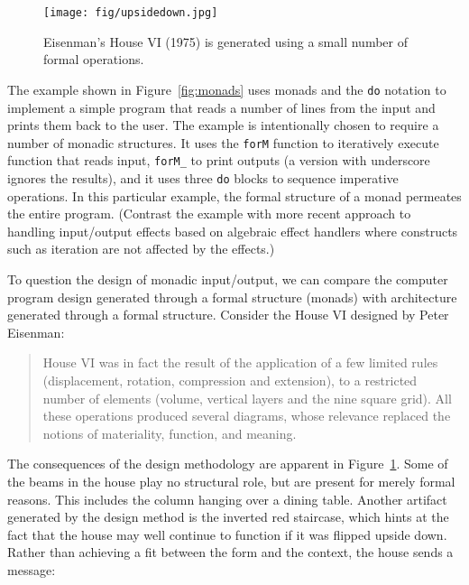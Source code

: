 \begin{figure}
\centering
\vspace{-1em}
\texttt{[image: fig/upsidedown.jpg]}
\caption{Eisenman's House VI (1975) is generated using a small number of formal operations.}
\label{fig:upsidedown}
\end{figure}

The example shown in Figure~\ref{fig:monads} uses monads and the \texttt{do} notation to
implement a simple program that reads a number of lines from the input and prints them back
to the user. The example is intentionally chosen to require a number of monadic structures.
It uses the \texttt{forM} function to iteratively execute function that reads input,
\texttt{forM\_} to print outputs (a version with underscore ignores the results),
and it uses three \texttt{do} blocks to sequence imperative operations. In this particular
example, the formal structure of a monad permeates the entire program. (Contrast the example
with more recent approach to handling input/output effects based on algebraic effect handlers
where constructs such as iteration are not affected by the effects.)

To question the design of monadic input/output, we can compare the computer program design
generated through a formal structure (monads) with architecture generated through a formal
structure. Consider the House VI designed by Peter Eisenman:

\begin{quote}
House VI was in fact the result of the application of a few limited rules
(displacement, rotation, compression and extension), to a restricted number of
elements (volume, vertical layers and the nine square grid). All these operations
produced several diagrams, whose relevance replaced the notions of materiality,
function, and meaning.
\end{quote}

The consequences of the design methodology are apparent in Figure~\ref{fig:upsidedown}.
Some of the beams in the house play no structural role, but are present for merely formal
reasons. This includes the column hanging over a dining table. Another artifact generated
by the design method is the inverted red staircase, which hints at the fact that the house
may well continue to function if it was flipped upside down. Rather than achieving a fit between
the form and the context, the house sends a message:

